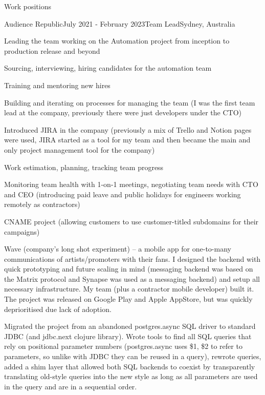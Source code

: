 \documentclass{resume} %
\begin{document}
\begin{rSection}{Work positions}
\begin{rSubsection}{Audience Republic}{July 2021 - February 2023}{Team Lead}{Sydney, Australia} %
\item Leading the team working on the Automation project from inception to production release and beyond
\item Sourcing, interviewing, hiring candidates for the automation team
\item Training and mentoring new hires
\item Building and iterating on processes for managing the team (I was the first team lead at the company,
    previously there were just developers under the CTO)
\item Introduced JIRA in the company (previously a mix of Trello and Notion pages were used, JIRA started as
    a tool for my team and then became the main and only project management tool for the company)
\item Work estimation, planning, tracking team progress
\item Monitoring team health with 1-on-1 meetings, negotiating team needs with CTO and CEO (introducing
    paid leave and public holidays for engineers working remotely as contractors)
\item CNAME project (allowing customers to use customer-titled subdomains for their campaigns)
\item Wave (company's long shot experiment) -- a mobile app for one-to-many
    communications of artists/promoters
    with their fans. I designed the backend with quick prototyping and future
    scaling in mind (messaging
    backend was based on the Matrix protocol and Synapse was used as a
    messaging backend) and setup all necessary infrastructure. My team (plus
    a contractor mobile developer) built it. The project was released
    on Google Play and Apple AppStore, but was quickly deprioritised due 
    lack of adoption.
\item Migrated the project from an abandoned postgres.async SQL driver to standard JDBC (and jdbc.next clojure library).
    Wrote tools to find all SQL queries that rely on positional parameter numbers (postgres.async uses \$1, \$2 to refer
    to parameters, so unlike with JDBC they can be reused in a query), rewrote queries, added a shim layer that allowed
    both SQL backends to coexist by transparently translating old-style queries into the new style as long as all parameters
    are used in the query and are in a sequential order.
~
\end{rSubsection}


\end{rSection}
\end{document}
